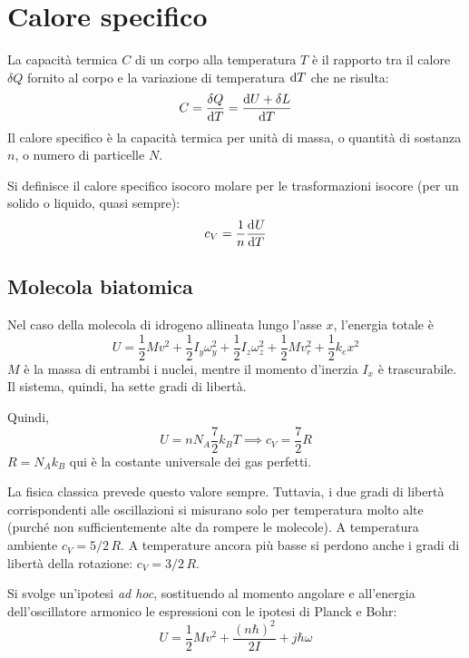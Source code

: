 \section{Calore specifico}

La capacità termica $C$ di un corpo alla temperatura $T$ è il rapporto tra il calore $\delta Q$ fornito al corpo e la variazione di temperatura $\mathrm{d} T$ che ne risulta:
\begin{equation}
    C = \frac{\delta Q}{\mathrm{d} T} = \frac{\mathrm{d} U + \delta L}{\mathrm{d} T}
\end{equation}
Il calore specifico è la capacità termica per unità di massa, o quantità di sostanza $n$, o numero di particelle $N$.

Si definisce il calore specifico isocoro molare per le trasformazioni isocore (per un solido o liquido, quasi sempre):
\begin{equation}
    c_V = \frac{1}{n} \der[U]{T}
\end{equation}

\subsection{Molecola biatomica}

Nel caso della molecola di idrogeno  allineata lungo l'asse $x$, l'energia totale è
\begin{equation}
    U = \frac{1}{2} M v^2
    + \frac{1}{2} I_y \omega_y^2
    + \frac{1}{2} I_z \omega_z^2
    + \frac{1}{2} M v_r^2
    + \frac{1}{2} k_e x^2
\end{equation}
$M$ è la massa di entrambi i nuclei, mentre il momento d'inerzia $I_x$ è trascurabile. Il sistema, quindi, ha sette gradi di libertà.

Quindi,
\begin{equation}
    U = n N_A \frac{7}{2} k_B T \implies c_V = \frac{7}{2} R
\end{equation}
$R = N_A k_B$ qui è la costante universale dei gas perfetti.

La fisica classica prevede questo valore sempre.
Tuttavia, i due gradi di libertà corrispondenti alle oscillazioni si misurano solo per temperatura molto alte (purché non sufficientemente alte da rompere le molecole).
A temperatura ambiente $c_V = 5/2 \, R$. A temperature ancora più basse si perdono anche i gradi di libertà della rotazione: $c_V = 3/2 \, R$.


Si svolge un'ipotesi \textit{ad hoc}, sostituendo al momento angolare e all'energia dell'oscillatore armonico le espressioni con le ipotesi di Planck e Bohr:
\begin{equation}
    U = \frac{1}{2} M v^2 + \frac{(n \hbar)^2}{2 I} + j \hbar \omega
\end{equation}

